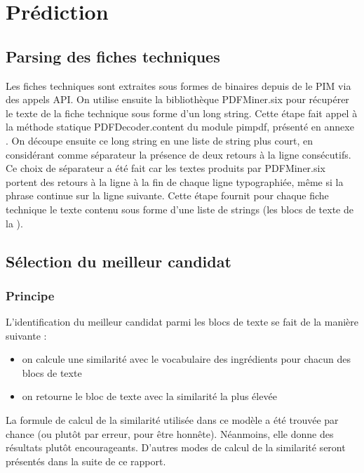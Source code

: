         \section{Prédiction}
            
            \subsection{Parsing des fiches techniques}

                Les fiches techniques sont extraites sous formes de binaires depuis de le PIM via des appels API.
                On utilise ensuite la bibliothèque PDFMiner.six pour récupérer le texte de la fiche technique sous forme d'un long string.
                Cette étape fait appel à la méthode statique PDFDecoder.content du module pimpdf, présenté en annexe .
                On découpe ensuite ce long string en une liste de string plus court, en considérant comme séparateur la présence de deux retours à la ligne consécutifs.
                Ce choix de séparateur a été fait car les textes produits par PDFMiner.six portent des retours à la ligne à la fin de chaque ligne typographiée, même si la phrase continue sur la ligne suivante.
                Cette étape fournit pour chaque fiche technique le texte contenu sous forme d'une liste de strings (les blocs de texte de la ).

            \subsection{Sélection du meilleur candidat}

                \subsubsection{Principe}
                L'identification du meilleur candidat parmi les blocs de texte se fait de la manière suivante :
                \begin{itemize}
                    \item on calcule une similarité avec le vocabulaire des ingrédients pour chacun des blocs de texte
                    \item on retourne le bloc de texte avec la similarité la plus élevée
                \end{itemize}
                La formule de calcul de la similarité utilisée dans ce modèle a été trouvée par chance (ou plutôt par erreur, pour être honnête).
                Néanmoins, elle donne des résultats plutôt encourageants.
                D'autres modes de calcul de la similarité seront présentés dans la suite de ce rapport.


